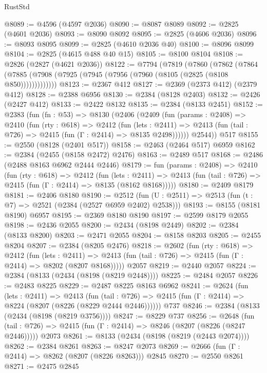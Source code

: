 \begin{lexlean}{RustStd}
\begin{coremodule}
@8089 := @4596 (@4597 @2036)
@8090 := @8087 @8089
@8092 := @2825 (@4601 @2036)
@8093 := @8090 @8092
@8095 := @2825 (@4606 @2036)
@8096 := @8093 @8095
@8099 := @2825 (@4610 @2036 @40)
@8100 := @8096 @8099
@8104 := @2825 (@4615 @488 @40 @15)
@8105 := @8100 @8104
@8108 := @2826 (@2827 (@4621 @2036))
@8122 := @7794
    (@7819
      (@7860
        (@7862
          (@7864 (@7885 (@7908 (@7925 (@7945 (@7956 (@7960 (@8105 (@2825 (@8108 @850)))))))))))))
@8123 := @2367 @412
@8127 := @2369 (@2373 @412) (@2379 @412)
@8128 := @2388 @6956
@8130 := @2384 (@8128 @2403)
@8132 := @2426 (@2427 @412)
@8133 := @2422 @8132
@8135 := @2384 (@8133 @2451)
@8152 := @2383
    (fun (fn : @53) =>
    @8130
      (@2406
        (@2409
          (fun (params : @2408) =>
          @2410
            (fun (rty : @618) =>
            @2412
              (fun (lets : @2411) =>
              @2413 (fun (tail : @726) => @2415 (fun (Γ : @2414) => @8135 @2498))))))
        @2544))
    @517
@8155 := @2550 (@8128 (@2401 @517))
@8158 := @2463 (@2464 @517) @6959
@8162 := @2384 (@2455 (@8158 @2472) @2476)
@8163 := @2489 @517
@8168 := @2486 (@2488 @8163 @6962 @2444 @2446)
@8179 := fun (params : @2408) =>
  @2410
    (fun (rty : @618) =>
    @2412
      (fun (lets : @2411) =>
      @2413 (fun (tail : @726) => @2415 (fun (Γ : @2414) => @8135 (@8162 @8168)))))
@8180 := @2409 @8179
@8181 := @2406 @8180
@8190 := @2512 (fun (U : @2511) => @2513 (fun (t : @7) => @2521 (@2384 (@2527 @6959 @2402) @2538)))
@8193 := @8155 (@8181 @8190) @6957
@8195 := @2369 @8180 @8190
@8197 := @2599 @8179 @2055
@8198 := @2436 @2055
@8200 := @2434 (@8198 @2449)
@8202 := @2384 (@8133 @8200)
@8203 := @2471 @2055
@8204 := @8158 @8203
@8205 := @2455 @8204
@8207 := @2384 (@8205 @2476)
@8218 := @2602
    (fun (rty : @618) =>
    @2412
      (fun (lets : @2411) =>
      @2413 (fun (tail : @726) => @2415 (fun (Γ : @2414) => @8202 (@8207 @8168)))))
    @2057
@8219 := @2440 @2057
@8224 := @2384 (@8133 (@2434 (@8198 (@8219 @2448))))
@8225 := @2484 @2057
@8226 := @2483 @8225
@8229 := @2487 @8225 @8163 @6962
@8241 := @2624
    (fun (lets : @2411) =>
    @2413
      (fun (tail : @726) => @2415 (fun (Γ : @2414) => @8224 (@8207 (@8226 (@8229 @2444 @2446))))))
    @737
@8246 := @2384 (@8133 (@2434 (@8198 (@8219 @3756))))
@8247 := @8229 @737
@8256 := @2648
    (fun (tail : @726) => @2415 (fun (Γ : @2414) => @8246 (@8207 (@8226 (@8247 @2446)))))
    @2073
@8261 := @8133 (@2434 (@8198 (@8219 (@2443 @2074))))
@8262 := @2384 @8261
@8263 := @8247 @2073
@8269 := @2666 (fun (Γ : @2414) => @8262 (@8207 (@8226 @8263))) @2845
@8270 := @2550 @8261
@8271 := @2475 @2845

\end{coremodule}
\end{lexlean}
